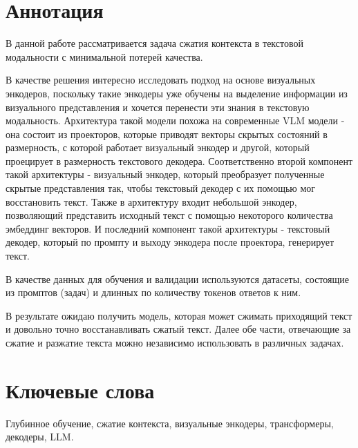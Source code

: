 \documentclass[a4paper,12pt]{extarticle}
\begin{document}
\newpage
\setcounter{page}{2}

{
	\hypersetup{linkcolor=black}
	\tableofcontents
}

\newpage

\newpage
\section*{Аннотация}   %

В данной работе рассматривается задача сжатия контекста в текстовой модальности с минимальной потерей качества.

В качестве решения интересно исследовать подход на основе визуальных энкодеров, поскольку такие энкодеры уже обучены на выделение информации из визуального представления и хочется перенести эти знания в текстовую модальность. Архитектура такой модели похожа на современные VLM модели - она состоит из проекторов, которые приводят векторы скрытых состояний в размерность, с которой работает визуальный энкодер и другой, который проецирует в размерность текстового декодера. Соответственно второй компонент такой архитектуры - визуальный энкодер, который преобразует полученные скрытые представления так, чтобы текстовый декодер с их помощью мог восстановить текст. Также в архитектуру входит небольшой энкодер, позволяющий представить исходный текст с помощью некоторого количества эмбеддинг векторов. И последний компонент такой архитектуры - текстовый декодер, который по промпту и выходу энкодера после проектора, генерирует текст.  

В качестве данных для обучения и валидации используются датасеты, состоящие из промптов (задач) и длинных по количеству токенов ответов к ним.

В результате ожидаю получить модель, которая может сжимать приходящий текст и довольно точно восстанавливать сжатый текст. Далее обе части, отвечающие за сжатие и разжатие текста можно независимо использовать в различных задачах.

\section*{Ключевые слова}
Глубинное обучение, сжатие контекста, визуальные энкодеры, трансформеры, декодеры, LLM.
\pagebreak
\end{document}
